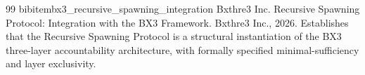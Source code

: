 \begin{thebibliography}{99}
bibitem{bx3_recursive_spawning_integration}
Bxthre3 Inc.
\newblock Recursive {Spawning} {Protocol}: {Integration} with the {BX3} {Framework}.
\newblock Bxthre3 Inc., 2026.
\newblock Establishes that the Recursive Spawning Protocol is a structural instantiation of the BX3 three-layer accountability architecture, with formally specified minimal-sufficiency and layer exclusivity.

\end{thebibliography}